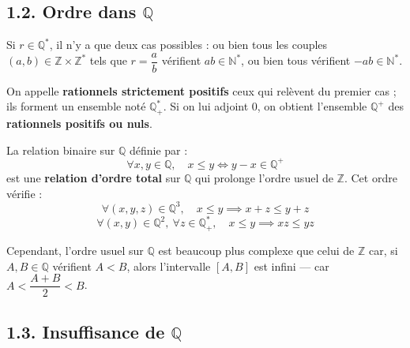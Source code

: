 \documentclass[a4paper,11pt]{article}
\newcommand{\N}{\mathbb{N}}
\newcommand{\Z}{\mathbb{Z}}
\newcommand{\Q}{\mathbb{Q}}
\newcommand{\mot}[1]{\textcolor{bordeaux}{\textbf{#1}}}
\begin{document}
\newpage
\subsection{1.2. Ordre dans $\Q$}

Si $r \in \Q^*$, il n'y a que deux cas possibles : ou bien tous les couples $(a, b) \in \Z \times \Z^*$ tels que $r = \dfrac{a}{b}$ vérifient $ab \in \N^*$, ou bien tous vérifient $-ab \in \N^*$.

On appelle \mot{rationnels strictement positifs} ceux qui relèvent du premier cas ; ils forment un ensemble noté $\Q_+^*$. Si on lui adjoint $0$, on obtient l'ensemble $\Q^+$ des \mot{rationnels positifs ou nuls}.

La relation binaire sur $\Q$ définie par :
\[
\forall x, y \in \Q, \quad x \le y \iff y - x \in \Q^+
\]
est une \mot{relation d'ordre total} sur $\Q$ qui prolonge l'ordre usuel de $\Z$. Cet ordre vérifie :
\[
\forall (x, y, z) \in \Q^3, \quad x \le y \implies x + z \le y + z
\]
\[
\forall (x, y) \in \Q^2, \ \forall z \in \Q_+^*, \quad x \le y \implies xz \le yz
\]

Cependant, l'ordre usuel sur $\Q$ est beaucoup plus complexe que celui de $\Z$ car, si $A, B \in \Q$ vérifient $A < B$, alors l'intervalle $[A, B]$ est infini — car $A < \dfrac{A + B}{2} < B$.

\newpage
\subsection{1.3. Insuffisance de $\Q$}
\end{document}
